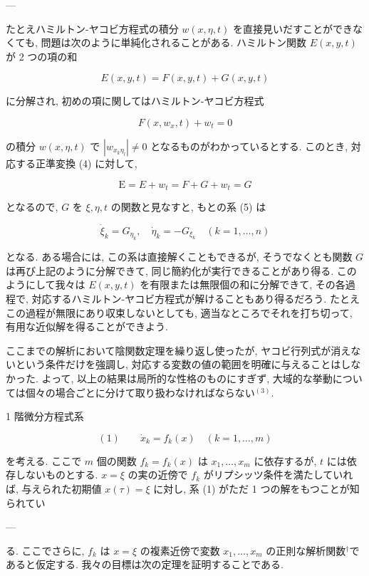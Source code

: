 \documentclass[dvipdfmx, leqno]{jsbook}
\begin{document}
---


たとえハミルトン-ヤコビ方程式の積分 $w(x, \eta, t)$ を直接見いだすことができなくても, 問題は次のように単純化されることがある. ハミルトン関数 $E(x, y, t)$ が 2 つの項の和

$$E(x, y, t) = F(x, y, t) + G(x, y, t)$$

に分解され, 初めの項に関してはハミルトン-ヤコビ方程式

$$F(x, w_x, t) + w_t = 0$$

の積分 $w(x, \eta, t)$ で $|w_{x_k \eta_l}| \neq 0$ となるものがわかっているとする. このとき, 対応する正準変換 (4) に対して,

$$\mathrm{E} = E + w_t = F + G + w_t = G$$

となるので, $G$ を $\xi, \eta, t$ の関数と見なすと, もとの系 (5) は

$$\dot{\xi}_k = G_{\eta_k}, \quad \dot{\eta}_k = -G_{\xi_k} \quad (k=1,\dots,n)$$

となる. ある場合には, この系は直接解くこともできるが, そうでなくとも関数 $G$ は再び上記のように分解できて, 同じ簡約化が実行できることがあり得る. このようにして我々は $E(x, y, t)$ を有限または無限個の和に分解できて, その各過程で, 対応するハミルトン-ヤコビ方程式が解けることもあり得るだろう. たとえこの過程が無限にあり収束しないとしても, 適当なところでそれを打ち切って, 有用な近似解を得ることができよう.

ここまでの解析において陰関数定理を繰り返し使ったが, ヤコビ行列式が消えないという条件だけを強調し, 対応する変数の値の範囲を明確に与えることはしなかった. よって, 以上の結果は局所的な性格のものにすぎず, 大域的な挙動については個々の場合ごとに分けて取り扱わなければならない$^{(3)}$.


1 階微分方程式系

$$(1) \qquad \dot{x}_k = f_k(x) \quad (k=1,\dots,m)$$

を考える. ここで $m$ 個の関数 $f_k = f_k(x)$ は $x_1, \dots, x_m$ に依存するが, $t$ には依存しないものとする. $x = \xi$ の実の近傍で $f_k$ がリプシッツ条件を満たしていれば, 与えられた初期値 $x(\tau) = \xi$ に対し, 系 (1) がただ 1 つの解をもつことが知られてい

---


る. ここでさらに, $f_k$ は $x = \xi$ の複素近傍で変数 $x_1, \dots, x_m$ の正則な解析関数$^\dagger$であると仮定する. 我々の目標は次の定理を証明することである.
\end{document}
